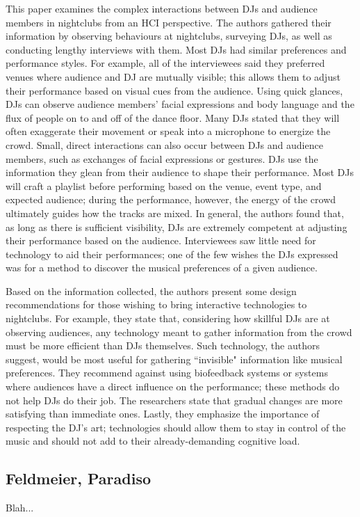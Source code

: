 This paper examines the complex interactions between DJs and audience members in nightclubs from an HCI perspective. The authors gathered their information by observing behaviours at nightclubs, surveying DJs, as well as conducting lengthy interviews with them. Most DJs had similar preferences and performance styles. For example, all of the interviewees said they preferred venues where audience and DJ are mutually visible; this allows them to adjust their performance based on visual cues from the audience. Using quick glances, DJs can observe audience members' facial expressions and body language and the flux of people on to and off of the dance floor. Many DJs stated that they will often exaggerate their movement or speak into a microphone to energize the crowd. Small, direct interactions can also occur between DJs and audience members, such as exchanges of facial expressions or gestures. DJs use the information they glean from their audience to shape their performance. Most DJs will craft a playlist before performing based on the venue, event type, and expected audience; during the performance, however, the energy of the crowd ultimately guides how the tracks are mixed. In general, the authors found that, as long as there is sufficient visibility, DJs are extremely competent at adjusting their performance based on the audience. Interviewees saw little need for technology to aid their performances; one of the few wishes the DJs expressed was for a method to discover the musical preferences of a given audience.

Based on the information collected, the authors present some design recommendations for those wishing to bring interactive technologies to nightclubs. For example, they state that, considering how skillful DJs are at observing audiences, any technology meant to gather information from the crowd must be more efficient than DJs themselves. Such technology, the authors suggest, would be most useful for gathering ``invisible" information like musical preferences. They recommend against using biofeedback systems or systems where audiences have a direct influence on the performance; these methods do not help DJs do their job. The researchers state that gradual changes are more satisfying than immediate ones. Lastly, they emphasize the importance of respecting the DJ's art; technologies should allow them to stay in control of the music and should not add to their already-demanding cognitive load.

\subsection{Feldmeier, Paradiso}

Blah...